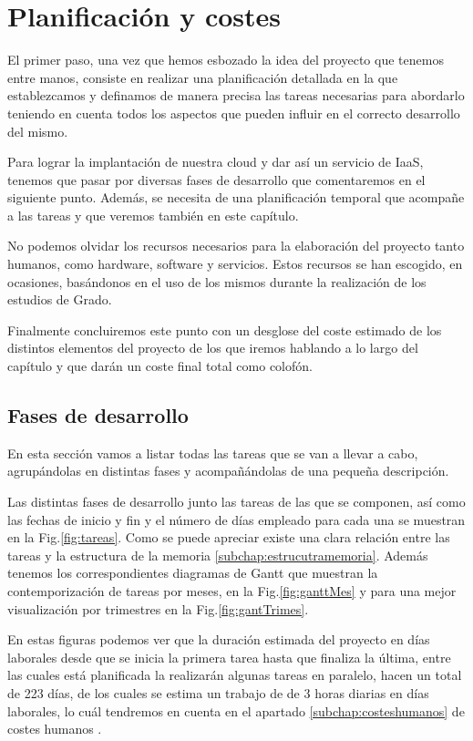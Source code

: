 \chapter{Planificación y costes} \label{chap:planificacionycostes}
El primer paso, una vez que hemos esbozado la idea del proyecto que tenemos entre manos, consiste en realizar una planificación detallada en la que establezcamos y definamos de manera precisa las tareas necesarias para abordarlo teniendo en cuenta todos los aspectos que pueden influir en el correcto desarrollo del mismo.

Para lograr la implantación de nuestra cloud y dar así un servicio de IaaS, tenemos que pasar por diversas fases de desarrollo que comentaremos en el siguiente punto. Además, se necesita de una planificación temporal que acompañe a las tareas y que veremos también en este capítulo.

No podemos olvidar los recursos necesarios para la elaboración del proyecto tanto humanos, como hardware,  software y servicios. Estos recursos se han escogido, en ocasiones, basándonos en el uso de los mismos durante la realización de los estudios de Grado.

Finalmente concluiremos este punto con un desglose del coste estimado de los distintos elementos del proyecto de los que iremos hablando a lo largo del capítulo y que darán un coste final total como colofón.


\section{Fases de desarrollo}
En esta sección vamos a listar todas las tareas que se van a llevar a cabo, agrupándolas en distintas fases y acompañándolas de una pequeña descripción. 

Las distintas fases de desarrollo junto las tareas de las que se componen, así como las fechas de inicio y fin y el número de días empleado para cada una se muestran en la Fig.\ref{fig:tareas}. Como se puede apreciar existe una clara relación entre las tareas y la estructura de la memoria \ref{subchap:estrucutramemoria}. Además tenemos los correspondientes diagramas de Gantt que muestran la contemporización de tareas por meses, en la Fig.\ref{fig:ganttMes} y para una mejor visualización por trimestres en la Fig.\ref{fig:gantTrimes}. 

En estas figuras podemos ver que la duración estimada del proyecto en días laborales desde que se inicia la primera tarea hasta que finaliza la última, entre las cuales está planificada la realizarán algunas tareas en paralelo, hacen un total de 223 días, de los cuales se estima un trabajo de de 3 horas diarias en días laborales, lo cuál tendremos en cuenta en el apartado \ref{subchap:costeshumanos} de costes humanos .

